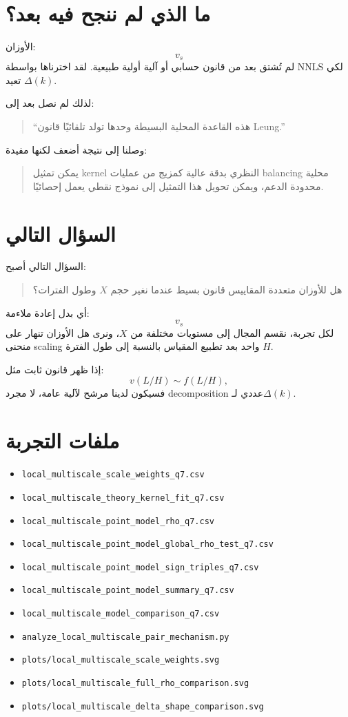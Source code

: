 \documentclass[12pt]{article}
\begin{document}
\section{ما الذي لم ننجح فيه بعد؟}

الأوزان:
\[
v_s
\]
لم تُشتق بعد من قانون حسابي أو آلية أولية طبيعية.
لقد اخترناها بواسطة NNLS لكي تعيد \(\Delta(k)\).

لذلك لم نصل بعد إلى:

\begin{quote}
``هذه القاعدة المحلية البسيطة وحدها تولد تلقائيًا قانون Leung.''
\end{quote}

وصلنا إلى نتيجة أضعف لكنها مفيدة:

\begin{quote}
يمكن تمثيل kernel النظري بدقة عالية كمزيج من عمليات balancing محلية
محدودة الدعم، ويمكن تحويل هذا التمثيل إلى نموذج نقطي يعمل إحصائيًا.
\end{quote}

\section{السؤال التالي}

السؤال التالي أصبح:

\begin{quote}
هل للأوزان متعددة المقاييس قانون بسيط عندما نغير حجم \(X\) وطول الفترات؟
\end{quote}

أي بدل إعادة ملاءمة:
\[
v_s
\]
لكل تجربة، نقسم المجال إلى مستويات مختلفة من \(X\)، ونرى هل الأوزان تنهار
على منحنى scaling واحد بعد تطبيع المقياس بالنسبة إلى طول الفترة \(H\).

إذا ظهر قانون ثابت مثل:
\[
v(L/H)\sim f(L/H),
\]
فسيكون لدينا مرشح لآلية عامة، لا مجرد decomposition عددي لـ\(\Delta(k)\).

\section{ملفات التجربة}

\begin{itemize}
\item \texttt{local\_multiscale\_scale\_weights\_q7.csv}
\item \texttt{local\_multiscale\_theory\_kernel\_fit\_q7.csv}
\item \texttt{local\_multiscale\_point\_model\_rho\_q7.csv}
\item \texttt{local\_multiscale\_point\_model\_global\_rho\_test\_q7.csv}
\item \texttt{local\_multiscale\_point\_model\_sign\_triples\_q7.csv}
\item \texttt{local\_multiscale\_point\_model\_summary\_q7.csv}
\item \texttt{local\_multiscale\_model\_comparison\_q7.csv}
\item \texttt{analyze\_local\_multiscale\_pair\_mechanism.py}
\item \texttt{plots/local\_multiscale\_scale\_weights.svg}
\item \texttt{plots/local\_multiscale\_full\_rho\_comparison.svg}
\item \texttt{plots/local\_multiscale\_delta\_shape\_comparison.svg}
\end{itemize}
\end{document}
